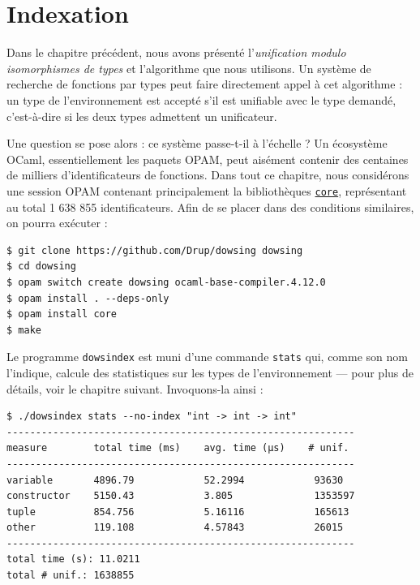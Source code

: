\documentclass[a4paper]{report}
\theoremstyle{definition}
\newcommand{\dowsindex}{\texttt{dowsindex}\xspace}
\begin{document}

\chapter {Indexation}

Dans le chapitre précédent, nous avons présenté l'\emph{unification modulo isomorphismes de types} et l'algorithme que nous utilisons. Un système de recherche de fonctions par types peut faire directement appel à cet algorithme : un type de l'environnement est accepté s'il est unifiable avec le type demandé, c'est-à-dire si les deux types admettent un unificateur.

Une question se pose alors : ce système passe-t-il à l'échelle ? Un écosystème OCaml, essentiellement les paquets OPAM, peut aisément contenir des centaines de milliers d'identificateurs de fonctions. Dans tout ce chapitre, nous considérons une session OPAM contenant principalement la bibliothèques \href{https://opensource.janestreet.com/core/}{\texttt{core}}, représentant au total 1 638 855 identificateurs. Afin de se placer dans des conditions similaires, on pourra exécuter :

\begin{verbatim}
$ git clone https://github.com/Drup/dowsing dowsing
$ cd dowsing
$ opam switch create dowsing ocaml-base-compiler.4.12.0
$ opam install . --deps-only
$ opam install core
$ make
\end{verbatim}

Le programme \dowsindex est muni d'une commande \texttt{stats} qui, comme son nom l'indique, calcule des statistiques sur les types de l'environnement — pour plus de détails, voir le chapitre suivant. Invoquons-la ainsi :

\begin{verbatim}
$ ./dowsindex stats --no-index "int -> int -> int"
------------------------------------------------------------
measure        total time (ms)    avg. time (µs)    # unif.
------------------------------------------------------------
variable       4896.79            52.2994            93630
constructor    5150.43            3.805              1353597
tuple          854.756            5.16116            165613
other          119.108            4.57843            26015
------------------------------------------------------------
total time (s): 11.0211
total # unif.: 1638855
\end{verbatim}
\end{document}
